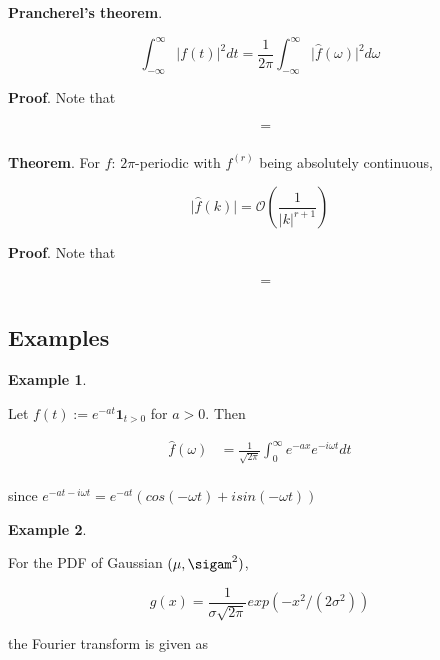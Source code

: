 \documentclass[12pt]{article}
\theoremstyle{nonumberbreak}
\begin{document}
\begin{theorem}
\textbf{Prancherel's theorem}. 

$$
\int_{-\infty}^\infty \vert f(t) \vert^2 dt = \frac{1}{2\pi} \int_{-\infty}^\infty \vert \hat{f}(\omega) \vert^2 d\omega
$$

\end{theorem}

\textbf{Proof}. Note that 

$$
\begin{aligned}
 &= \\[8pt]
\end{aligned}
$$




\begin{theorem}
\textbf{Theorem}. For $f$: $2\pi$-periodic with $f^{(r)}$ being absolutely continuous,

$$
\vert \hat{f}(k) \vert = \mathcal{O} \left( \frac{1}{|k|^{r+1}} \right)
$$
\end{theorem}

\textbf{Proof}. Note that 

$$
\begin{aligned}
 &= \\[8pt]
\end{aligned}
$$





\subsection*{Examples}

\textbf{Example 1}.

Let $f(t) := e^{-at} \mathbf{1}_{t>0}$ for $a >0$. Then

$$
\begin{aligned}
\hat{f}(\omega) &= \frac{1}{\sqrt{2\pi}} \int_0^\infty e^{-ax} e^{-i \omega t} dt \\[8pt]
\end{aligned}
$$

since $e^{-at - i\omega t} = e^{-at} \left( cos(-\omega t) + i sin( - \omega t) \right) $ 



\textbf{Example 2}.

For the PDF of Gaussian $(\mu, \sigam^2)$,

$$
g(x) = \frac{1}{\sigma \sqrt{2\pi}} exp\left( -x^2/(2\sigma^2) \right)
$$

the Fourier transform is given as
\end{document}
